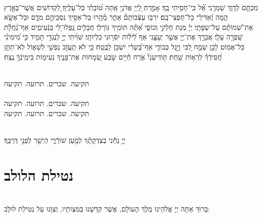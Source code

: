 \documentclass[twoside, openany, parskip=half, 11pt]{book}
\begin{document}
\begin{sometimes}

\\
%
 מִכְתָּ֥ם לְדָוִ֑ד שָׁמְרֵ֥נִי אֵ֝֗ל כִּֽי־חָסִ֥יתִי בָֽךְ׃ אָמַ֣רְתְּ לַ֭יְיָ אֲדֹנָי֥ אַֽתָּה ט֝וֹבָתִ֗י בַּל־עָלֶֽיךָ׃ לִ֭קְדוֹשִׁים אֲשֶׁר־בָּאָ֣רֶץ הֵ֑מָּה וְ֝אַדִּירֵ֗י כָּל־חֶפְצִי־בָֽם׃ יִרְבּ֥וּ עַצְּֿבוֹתָם֘ אַחֵ֢ר מָ֫הָ֥רוּ בַּל־אַסִּ֣יךְ נִסְכֵּיהֶ֣ם מִדָּ֑ם וּבַל־אֶשָּׂ֥א אֶת־שְׁ֝מוֹתָ֗ם עַל־שְׂפָתָֽי׃ יְיָ֗ מְנָת חֶלְקִ֣י וְכוֹסִ֑י אַ֝תָּ֗ה תּוֹמִ֥יךְ גּֽוֹרָלִֽי׃ חֲבָלִ֣ים נָֽפְלוּ־לִ֭י בַּנְּֿעִימִ֑ים אַף־נַֽ֝חֲלָ֗ת שָֽׁפְרָ֥ה עָלָֽי׃ אֲבָרֵ֣ךְ אֶת־יְ֖יָ אֲשֶׁ֣ר יְעָצָ֑נִי אַף לֵ֝יל֗וֹת יִסְּֿר֥וּנִי כִלְיוֹתָֽי׃ שִׁוִּ֨יתִי יְיָ֣ לְנֶגְדִּ֣י תָמִ֑יד כִּ֥י מִ֝ימִינִ֗י בַּל־אֶמּֽוֹט׃ לָכֵ֤ן שָׂמַ֣ח לִ֭בִּי וַיָּ֣גֶל כְּבוֹדִ֑י אַף־בְּ֝שָׂרִ֗י יִשְׁכֹּ֥ן לָבֶֽטַח׃ כִּ֤י לֹא תַֽעֲזֹ֣ב נַפְשִׁ֣י לִשְׁא֑וֹל לֹֽא־תִתֵּ֥ן חֲ֝סִֽידְֿךָ֗ לִרְא֥וֹת שָֽׁחַת׃ תּ֤וֹדִיעֵנִי֘ אֹ֢רַח חַ֫יִּ֥ים שׂ֣בַע שְׂ֭מָחוֹת אֶת־פָּנֶ֑יךָ נְעִימ֖וֹת בִּימִֽינְֿךָ֣ נֶֽצַח׃

\end{sometimes}



\begin{sometimes}

\\
תקיעה. שברים. תרועה. תקיעה\\
\\
תקיעה. שברים. תרועה. תקיעה\\
תקיעה. שברים. תרועה. תקיעה

\end{sometimes}

\vspace{-.5\baselineskip}

\\
 יְיָ֤ נְחֵ֬נִי בְצִדְקָתֶ֗ךָ לְמַ֥עַן שׁוֹרְֿרָ֑י הַיְשַׁ֖ר לְפָנַ֣י דַּרְכֶּֽךָ׃

\vfill

\quad{}\quad{}


 



\section[נטילת הלולב]{ נטילת הלולב }
\label{lulav}
\\
בָּרוּךְ אַתָּה יְיָ אֱלֹהֵינוּ מֶלֶךְ הָעוֹלָם, אֲשֶׁר קִדְּשָׁנוּ בְּמִצְוֹתָיו, וְצִוָּנוּ עַל נְטִילַת לוּלָב:
\end{document}
